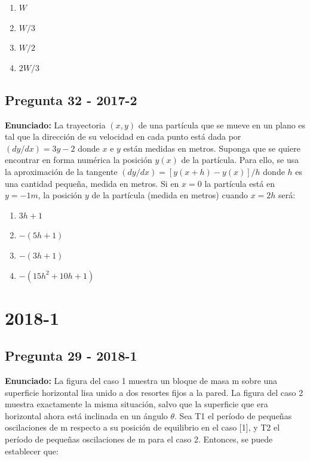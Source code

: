 \documentclass{article}
\begin{document}
\begin{enumerate}
    \item[a)] $W$
    \item[b)] $W / 3$
    \item[c)] $W / 2$
    \item[d)] $2 W / 3$
\end{enumerate}
\vspace{0.5cm}

\subsection*{Pregunta 32 - 2017-2}
\textbf{Enunciado:} La trayectoria $(x, y)$ de una partícula que se mueve en un plano es tal que la dirección de su velocidad en cada punto está dada por $(dy/dx) = 3y - 2$ donde $x$ e $y$ están medidas en metros. Suponga que se quiere encontrar en forma numérica la posición $y(x)$ de la partícula. Para ello, se usa la aproximación de la tangente $(dy/dx) = [y(x + h) - y(x)]/h$ donde $h$ es una cantidad pequeña, medida en metros. Si en $x = 0$ la partícula está en $y = -1m$, la posición $y$ de la partícula (medida en metros) cuando $x = 2h$ será:



\begin{enumerate}
    \item[a)] $3 h+1$
    \item[b)] $-(5 h+1)$
    \item[c)] $-(3 h+1)$
    \item[d)] $-(15 h^2+10 h+1)$
\end{enumerate}
\vspace{0.5cm}

\section{2018-1}

\subsection*{Pregunta 29 - 2018-1}
\textbf{Enunciado:} La figura del caso 1 muestra un bloque de masa m sobre una superficie horizontal lisa unido a dos resortes fijos a la pared. La figura del caso 2 muestra exactamente la misma situación, salvo que la superficie que era horizontal ahora está inclinada en un ángulo $\theta$. Sea T1 el período de pequeñas oscilaciones de m respecto a su posición de equilibrio en el caso [1], y T2 el período de pequeñas oscilaciones de m para el caso 2. Entonces, se puede establecer que:
\end{document}
